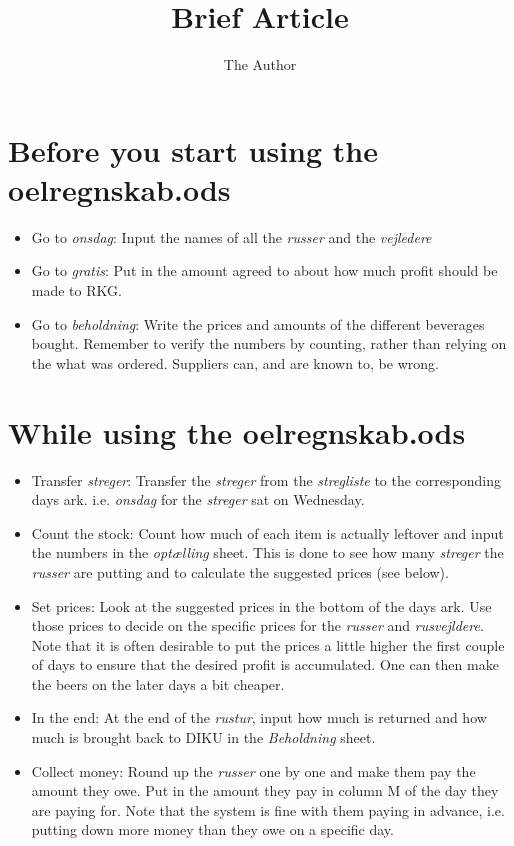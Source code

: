 \documentclass[11pt]{article} %
\title{Brief Article}
\author{The Author}
\begin{document}
\section*{Before you start using the oelregnskab.ods}

\begin{itemize}

\item Go to \emph{onsdag}: Input the names of all the \emph{russer} and the \emph{vejledere}

\item Go to \emph{gratis}: Put in the amount agreed to about how much profit should be made to RKG.

\item Go to \emph{beholdning}: Write the prices and amounts of the different beverages bought. Remember to verify the numbers by counting, rather than relying on the what was ordered. Suppliers can, and are known to, be wrong.

\end{itemize}

\section*{While using the oelregnskab.ods}

\begin{itemize}

\item Transfer \emph{streger}: Transfer the \emph{streger} from the \emph{stregliste} to the corresponding days ark. i.e. \emph{onsdag} for the \emph{streger} sat on Wednesday.

\item Count the stock: Count how much of each item is actually leftover and input the numbers in the \emph{optælling} sheet. This is done to see how many \emph{streger} the \emph{russer} are putting and to calculate the suggested prices (see below).

\item Set prices: Look at the suggested prices in the bottom of the days ark. Use those prices to decide on the specific prices for the \emph{russer} and \emph{rusvejldere}. Note that it is often desirable to put the prices a little higher the first couple of days to ensure that the desired profit is accumulated. One can then make the beers on the later days a bit cheaper.

\item In the end: At the end of the \emph{rustur}, input how much is returned and how much is brought back to DIKU in the \emph{Beholdning} sheet.

\item Collect money: Round up the \emph{russer} one by one and make them pay the amount they owe. Put in the amount they pay in column M of the day they are paying for. Note that the system is fine with them paying in advance, i.e. putting down more money than they owe on a specific day.

\end{itemize}
\end{document}
